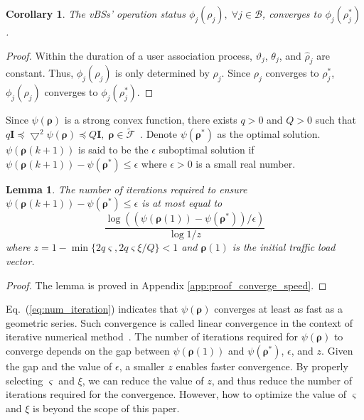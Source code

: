 \documentclass[journal]{IEEEtran}
\newtheorem{lemma}{Lemma}
\newtheorem{corollary}{Corollary}
\theoremstyle{definition}
\begin{document}
\begin{corollary}
\label{thm:alg_converge_col}
The vBSs' operation status $\phi_{j}(\rho_{j}), \;\forall j \in \mathcal{B}$, converges to $\phi_{j}(\rho^{*}_{j})$.
\end{corollary}
\begin{proof}
Within the duration of a user association process, $\vartheta_{j}$, $\theta_{j}$, and $\hat{\rho}_{j}$ are constant. Thus, $\phi_{j}(\rho_{j})$ is only determined by $\rho_{j}$. Since $\rho_{j}$ converges to $\rho^{*}_{j}$, $\phi_{j}(\rho_{j})$ converges to $\phi_{j}(\rho^{*}_{j})$.
\end{proof}
Since $\psi(\boldsymbol{\rho})$ is a strong convex function, there exists $q>0$ and $Q>0$ such that $q\boldsymbol{I} \preceq\bigtriangledown^{2}\psi(\boldsymbol{\rho})\preceq Q\boldsymbol{I},\;\boldsymbol{\rho}\in\tilde{\mathcal{F}}$~\cite{Boyd:2004:CVX}. Denote $\psi(\boldsymbol{\rho}^{*})$ as the optimal solution. $\psi(\boldsymbol{\rho}(k+1))$ is said to be the $\epsilon$ suboptimal solution if $\psi(\boldsymbol{\rho}(k+1))-\psi(\boldsymbol{\rho}^{*})\leq \epsilon$ where $\epsilon>0$ is a small real number.
\begin{lemma}
\label{thm:converge_speed}
The number of iterations required to ensure $\psi(\boldsymbol{\rho}(k+1))-\psi(\boldsymbol{\rho}^{*})\leq \epsilon$ is at most equal to
\begin{equation}
\label{eq:num_iteration}
\frac{\log((\psi(\boldsymbol{\rho}(1))-\psi(\boldsymbol{\rho}^{*}))/\epsilon)}{\log{1/z}}
\end{equation}
where $z=1-\min\{2q\varsigma,2q\varsigma\xi/Q\}<1$ and $\boldsymbol{\rho}(1)$ is the initial traffic load vector.
\end{lemma}
\begin{proof}
The lemma is proved in Appendix \ref{app:proof_converge_speed}.
\end{proof}

Eq.~(\ref{eq:num_iteration}) indicates that $\psi(\boldsymbol{\rho})$ converges at least as fast as a geometric series. Such convergence is called linear convergence in the context of iterative numerical method~\cite{Boyd:2004:CVX}. The number of iterations required for $\psi(\boldsymbol{\rho})$ to converge depends on the gap between $\psi(\boldsymbol{\rho}(1))$ and $\psi(\boldsymbol{\rho}^{*})$, $\epsilon$, and $z$. Given the gap and the value of $\epsilon$, a smaller $z$ enables faster convergence. By properly selecting $\varsigma$ and $\xi$, we can reduce the value of $z$, and thus reduce the number of iterations required for the convergence. However, how to optimize the value of $\varsigma$ and $\xi$ is beyond the scope of this paper.
\end{document}
